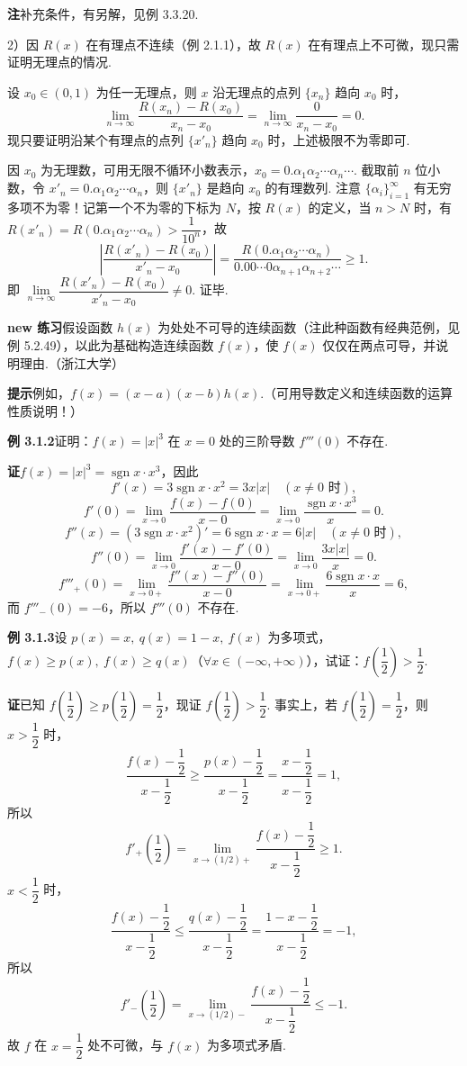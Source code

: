 \documentclass[UTF8,12pt,a4paper,fontset=fandol]{ctexart}
\begin{document}
\noindent\textbf{注}\quad 补充条件，有另解，见例 3.3.20.

2）因 $R(x)$ 在有理点不连续（例 2.1.1），故 $R(x)$ 在有理点上不可微，现只需证明无理点的情况.

设 $x_0\in(0,1)$ 为任一无理点，则 $x$ 沿无理点的点列 $\{x_n\}$ 趋向 $x_0$ 时，
\[
  \lim_{n\to\infty}\frac{R(x_n)-R(x_0)}{x_n-x_0}
  =\lim_{n\to\infty}\frac0{x_n-x_0}=0.
\]
现只要证明沿某个有理点的点列 $\{x'_n\}$ 趋向 $x_0$ 时，上述极限不为零即可.

因 $x_0$ 为无理数，可用无限不循环小数表示，$x_0=0.\alpha_1\alpha_2\cdots\alpha_n\cdots$. 截取前 $n$ 位小数，令 $x'_n=0.\alpha_1\alpha_2\cdots\alpha_n$，则 $\{x'_n\}$ 是趋向 $x_0$ 的有理数列. 注意 $\{\alpha_i\}_{i=1}^\infty$ 有无穷多项不为零！记第一个不为零的下标为 $N$，按 $R(x)$ 的定义，当 $n>N$ 时，有 $R(x'_n)=R(0.\alpha_1\alpha_2\cdots\alpha_n)>\dfrac1{10^n}$，故
\[
  \left|\frac{R(x'_n)-R(x_0)}{x'_n-x_0}\right|
  =\frac{R(0.\alpha_1\alpha_2\cdots\alpha_n)}
  {0.00\cdots0\alpha_{n+1}\alpha_{n+2}\cdots}\ge1.
\]
即 $\lim\limits_{n\to\infty}\dfrac{R(x'_n)-R(x_0)}{x'_n-x_0}\ne0$. 证毕.

\noindent\textbf{new 练习}\quad 假设函数 $h(x)$ 为处处不可导的连续函数（注\quad 此种函数有经典范例，见例 5.2.49），以此为基础构造连续函数 $f(x)$，使 $f(x)$ 仅仅在两点可导，并说明理由.（浙江大学）

\noindent\textbf{提示}\quad 例如，$f(x)=(x-a)(x-b)h(x)$.（可用导数定义和连续函数的运算性质说明！）

\noindent\textbf{例 3.1.2}\quad 证明：$f(x)=|x|^3$ 在 $x=0$ 处的三阶导数 $f'''(0)$ 不存在.

\noindent\textbf{证}\quad $f(x)=|x|^3=\operatorname{sgn}x\cdot x^3$，因此
\[
  f'(x)=3\operatorname{sgn}x\cdot x^2=3x|x|\quad(x\ne0\text{ 时}),
\]
\[
  f'(0)=\lim_{x\to0}\frac{f(x)-f(0)}{x-0}
  =\lim_{x\to0}\frac{\operatorname{sgn}x\cdot x^3}{x}=0.
\]
\[
  f''(x)=(3\operatorname{sgn}x\cdot x^2)'=6\operatorname{sgn}x\cdot x=6|x|\quad(x\ne0\text{ 时}),
\]
\[
  f''(0)=\lim_{x\to0}\frac{f'(x)-f'(0)}{x-0}
  =\lim_{x\to0}\frac{3x|x|}{x}=0.
\]
\[
  f'''_+(0)=\lim_{x\to0+}\frac{f''(x)-f''(0)}{x-0}
  =\lim_{x\to0+}\frac{6\operatorname{sgn}x\cdot x}{x}=6,
\]
而 $f'''_-(0)=-6$，所以 $f'''(0)$ 不存在.

\noindent\textbf{例 3.1.3}\quad 设 $p(x)=x,\ q(x)=1-x,\ f(x)$ 为多项式，$f(x)\ge p(x),\ f(x)\ge q(x)$（$\forall x\in(-\infty,+\infty)$），试证：$f\left(\dfrac12\right)>\dfrac12$.

\noindent\textbf{证}\quad 已知 $f\left(\dfrac12\right)\ge p\left(\dfrac12\right)=\dfrac12$，现证 $f\left(\dfrac12\right)>\dfrac12$. 事实上，若 $f\left(\dfrac12\right)=\dfrac12$，则 $x>\dfrac12$ 时，
\[
  \frac{f(x)-\dfrac12}{x-\dfrac12}
  \ge\frac{p(x)-\dfrac12}{x-\dfrac12}
  =\frac{x-\dfrac12}{x-\dfrac12}=1,
\]
所以
\[
  f'_+\left(\frac12\right)
  =\lim_{x\to(1/2)+}\frac{f(x)-\dfrac12}{x-\dfrac12}\ge1.
\]
$x<\dfrac12$ 时，
\[
  \frac{f(x)-\dfrac12}{x-\dfrac12}
  \le\frac{q(x)-\dfrac12}{x-\dfrac12}
  =\frac{1-x-\dfrac12}{x-\dfrac12}=-1,
\]
所以
\[
  f'_-\left(\frac12\right)
  =\lim_{x\to(1/2)-}\frac{f(x)-\dfrac12}{x-\dfrac12}\le-1.
\]
故 $f$ 在 $x=\dfrac12$ 处不可微，与 $f(x)$ 为多项式矛盾.
\end{document}

